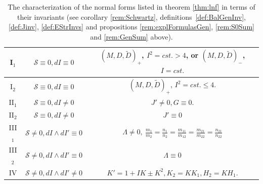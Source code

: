 \documentclass[10pt]{amsart}
\theoremstyle{definition}
\begin{document}
\begin{table}[h]
    \centering
    \begin{tabular}{c|c|c}
    \hline\hline
  I$_1$   & $\mathcal{S}\equiv 0, dI \equiv 0$   & $(M, D, \tilde D)_+$, $I^2 = cst. > 4$, or $(M, D, \tilde D)_-$, $I = cst.$ \\
  \hline 
  I$_2$  & $\mathcal{S}\equiv 0, dI \equiv 0$   & $(M, D, \tilde D)_+$, $I^2 = cst. \le 4$. \\
    \hline\hline 
   II$_1$ & $\mathcal{S}\equiv 0, dI\ne 0$  & $J'\ne 0, G\equiv 0$.   \\
   \hline 
   II$_2$ & $\mathcal{S}\equiv 0, dI\ne 0$  & $J'\equiv 0$   \\
   \hline\hline 
   III$_1$  &  $\mathcal{S}\ne 0, dI\wedge dI'\equiv 0$  &  $\Lambda \ne 0, ~\frac{m_1}{m_2} = \frac{n_1}{n_2} = \frac{m_{11}}{m_{12}} = \frac{m_{21}}{m_{22}} = \frac{n_{21}}{n_{22}}$  \\
   \hline 
   III$_2$  &  $\mathcal{S}\ne 0, dI\wedge dI'\equiv 0$  &  $\Lambda \equiv 0$    \\
     \hline\hline 
    IV &  $\mathcal{S}\ne 0, dI\wedge dI'\ne 0$  &  $K' = 1 + IK \pm K^2, K_2 = KK_1, H_2 = KH_1$.   \\
    \hline\hline 
    \end{tabular}
    \caption{The characterization of the normal forms listed in theorem \ref{thm:lnf} in terms of their invariants (see corollary \ref{rem:Schwartz}, definitions~\ref{def:BalGenInv}, \ref{def:Jinv}, \ref{def:EStrInvs} and propositions \ref{rem:explFormulasGen}, \ref{rem:S0Sum} and \ref{rem:GenSum} above). }
    \label{table:Summary}
\end{table}
\end{document}
